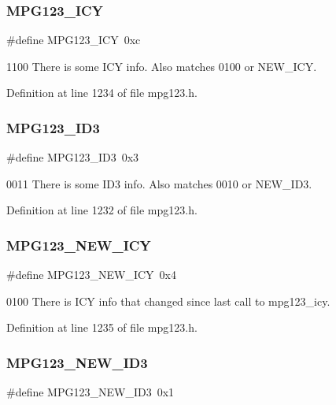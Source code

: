 \subsubsection{\texorpdfstring{MPG123\_ICY}{MPG123\_ICY}}
{\footnotesize\ttfamily \#define M\+P\+G123\+\_\+\+I\+CY~0xc}

1100 There is some I\+CY info. Also matches 0100 or N\+E\+W\+\_\+\+I\+CY. 

Definition at line 1234 of file mpg123.\+h.

\mbox{\label{group__mpg123__metadata_gacee1d4e2cac4601f57eddadcc828f66c}} 
\subsubsection{\texorpdfstring{MPG123\_ID3}{MPG123\_ID3}}
{\footnotesize\ttfamily \#define M\+P\+G123\+\_\+\+I\+D3~0x3}

0011 There is some I\+D3 info. Also matches 0010 or N\+E\+W\+\_\+\+I\+D3. 

Definition at line 1232 of file mpg123.\+h.

\mbox{\label{group__mpg123__metadata_ga25db33a48f531fd4da02dbf12d53e5be}} 
\subsubsection{\texorpdfstring{MPG123\_NEW\_ICY}{MPG123\_NEW\_ICY}}
{\footnotesize\ttfamily \#define M\+P\+G123\+\_\+\+N\+E\+W\+\_\+\+I\+CY~0x4}

0100 There is I\+CY info that changed since last call to mpg123\+\_\+icy. 

Definition at line 1235 of file mpg123.\+h.

\mbox{\label{group__mpg123__metadata_ga3fb42527b89f66d9caa6aee4fa6aaaae}} 
\subsubsection{\texorpdfstring{MPG123\_NEW\_ID3}{MPG123\_NEW\_ID3}}
{\footnotesize\ttfamily \#define M\+P\+G123\+\_\+\+N\+E\+W\+\_\+\+I\+D3~0x1}

